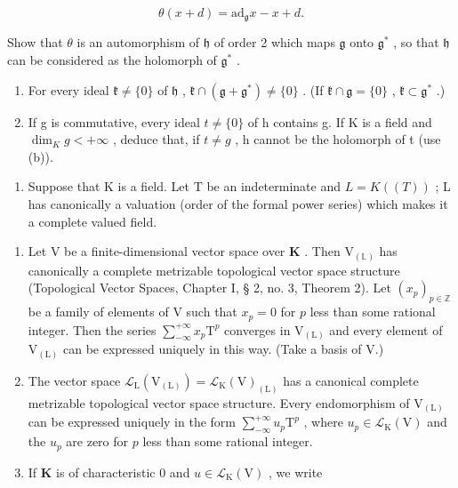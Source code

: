 \[
\theta (x + d) = \mathrm{ad} _ {\mathfrak {g}} x - x + d.
\]

Show that \(\theta\) is an automorphism of \(\mathfrak{h}\) of order 2 which maps \(\mathfrak{g}\) onto \(\mathfrak{g}^*\) , so that \(\mathfrak{h}\) can be considered as the holomorph of \(\mathfrak{g}^*\) .

\begin{enumerate}
\def\labelenumi{(\alph{enumi})}
\setcounter{enumi}{2}
\item
  For every ideal \(\mathfrak{k} \neq \{0\}\) of \(\mathfrak{h}\) , \(\mathfrak{k} \cap (\mathfrak{g} + \mathfrak{g}^*) \neq \{0\}\) . (If \(\mathfrak{k} \cap \mathfrak{g} = \{0\}\) , \(\mathfrak{k} \subset \mathfrak{g}^*\) .)
\item
  If g is commutative, every ideal \(t \neq \{0\}\) of h contains g. If K is a field and \(\dim_{K} g < +\infty\) , deduce that, if \(t \neq g\) , h cannot be the holomorph of t (use (b)).
\end{enumerate}

\begin{enumerate}
\def\labelenumi{\arabic{enumi}.}
\setcounter{enumi}{16}
\tightlist
\item
  Suppose that K is a field. Let T be an indeterminate and \(L = K((T))\) ; L has canonically a valuation (order of the formal power series) which makes it a complete valued field.
\end{enumerate}

\begin{enumerate}
\def\labelenumi{(\alph{enumi})}
\item
  Let \(\mathrm{V}\) be a finite-dimensional vector space over \(\mathbf{K}\) . Then \(\mathrm{V}_{(\mathbb{L})}\) has canonically a complete metrizable topological vector space structure (Topological Vector Spaces, Chapter I, § 2, no. 3, Theorem 2). Let \((x_{p})_{p\in \mathbb{Z}}\) be a family of elements of \(\mathrm{V}\) such that \(x_{p} = 0\) for \(p\) less than some rational integer. Then the series \(\sum_{-\infty}^{+\infty}x_p\mathrm{T}^p\) converges in \(\mathrm{V}_{(\mathrm{L})}\) and every element of \(\mathrm{V}_{(\mathrm{L})}\) can be expressed uniquely in this way. (Take a basis of V.)
\item
  The vector space \(\mathcal{L}_{\mathrm{L}}(\mathrm{V}_{(\mathrm{L})}) = \mathcal{L}_{\mathrm{K}}(\mathrm{V})_{(\mathrm{L})}\) has a canonical complete metrizable topological vector space structure. Every endomorphism of \(\mathrm{V}_{(\mathrm{L})}\) can be expressed uniquely in the form \(\sum_{-\infty}^{+\infty}u_p\mathrm{T}^p\) , where \(u_{p}\in \mathcal{L}_{\mathrm{K}}(\mathrm{V})\) and the \(u_{p}\) are zero for \(p\) less than some rational integer.
\item
  If \(\mathbf{K}\) is of characteristic 0 and \(u\in \mathcal{L}_{\mathrm{K}}(\mathrm{V})\) , we write
\end{enumerate}

